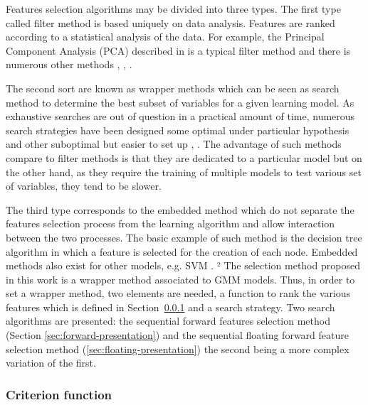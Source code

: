 \documentclass[journal,peerreview,onecolumn]{IEEEtran}
\begin{document}
    Features selection algorithms may be divided into three types. The first type called filter method is based uniquely on data analysis. Features are ranked according to a statistical analysis of the data. For example, the Principal Component Analysis (PCA) described in \cite{jimenez1998supervised} is a typical filter method and there is numerous other methods \cite{bruzzone1995extension}, \cite{biesiada2007feature}, \cite{demir2008phase}.

    The second sort are known as wrapper methods which can be seen as search method to determine the best subset of variables for a given learning model. As exhaustive searches are out of question in a practical amount of time, numerous search strategies have been designed some optimal under particular hypothesis \cite{narendra1977branch} and other suboptimal but easier to set up \cite{whitney1971direct}, \cite{somol1999adaptive}. The advantage of such methods compare to filter methods is that they are dedicated to a particular model but on the other hand, as they require the training of multiple models to test various set of variables, they tend to be slower.

    The third type corresponds to the embedded method which do not separate the features selection process from the learning algorithm and allow interaction between the two processes. The basic example of such method is the decision tree algorithm in which a feature is selected for the creation of each node. Embedded methods also exist for other models, e.g. SVM \cite{guyon2002gene} \cite{weston2003use}.
²
    The selection method proposed in this work is a wrapper method associated to GMM models. Thus, in order to set a wrapper method, two elements are needed, a function to rank the various features which is defined in Section~\ref{sec:criterion} and a search strategy. Two search algorithms are presented: the sequential forward features selection method (Section \ref{sec:forward-presentation}) and the sequential floating forward feature selection method (\ref{sec:floating-presentation}) the second being a more complex variation of the first.

        \subsubsection{Criterion function}
        \label{sec:criterion}

        \hspace{0pt} \\
\end{document}
